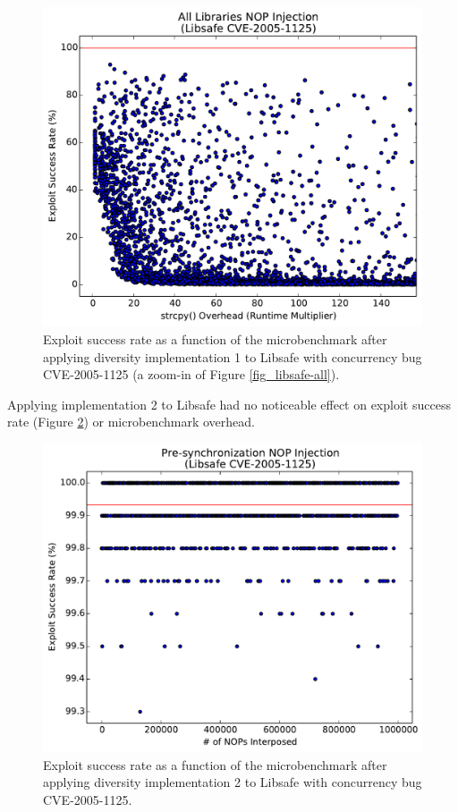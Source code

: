 \begin{figure}
	\centering
	\includegraphics[width=\columnwidth]{figures/libsafe-all-zoom}
	\caption{Exploit success rate as a function of the microbenchmark after applying diversity implementation 1 to Libsafe with concurrency bug CVE-2005-1125 (a zoom-in of Figure \ref{fig_libsafe-all}).}
	\label{fig_libsafe-all-zoom}
\end{figure}

Applying implementation 2 to Libsafe had no noticeable effect on exploit success rate (Figure \ref{fig_libsafe-pre}) or microbenchmark overhead.
\begin{figure}
	\centering
	\includegraphics[width=\columnwidth]{figures/libsafe-pre}
	\caption{Exploit success rate as a function of the microbenchmark after applying diversity implementation 2 to Libsafe with concurrency bug CVE-2005-1125.}
	\label{fig_libsafe-pre}
\end{figure}


